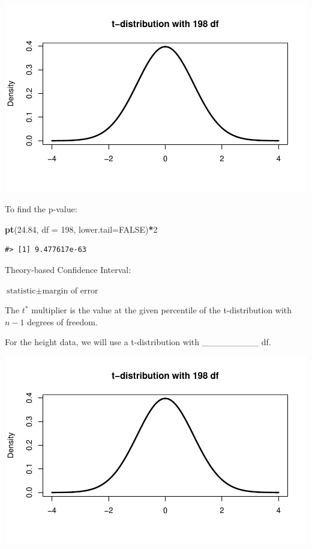 \documentclass[
]{report}
\newenvironment{Shaded}{\begin{snugshade}}{\end{snugshade}}
\newcommand{\AttributeTok}[1]{\textcolor[rgb]{0.13,0.29,0.53}{#1}}
\newcommand{\ConstantTok}[1]{\textcolor[rgb]{0.56,0.35,0.01}{#1}}
\newcommand{\DecValTok}[1]{\textcolor[rgb]{0.00,0.00,0.81}{#1}}
\newcommand{\FloatTok}[1]{\textcolor[rgb]{0.00,0.00,0.81}{#1}}
\newcommand{\FunctionTok}[1]{\textcolor[rgb]{0.13,0.29,0.53}{\textbf{#1}}}
\newcommand{\NormalTok}[1]{#1}
\newcommand{\SpecialCharTok}[1]{\textcolor[rgb]{0.81,0.36,0.00}{\textbf{#1}}}
\newcommand{\rgi}{\hspace{24pt}}  %
\begin{document}
\begin{center}\includegraphics[width=0.7\linewidth]{11-VN11-paired_files/figure-latex/pvalueheight-1} \end{center}

To find the p-value:

\begin{Shaded}
\begin{Highlighting}[]
\FunctionTok{pt}\NormalTok{(}\FloatTok{24.84}\NormalTok{, }\AttributeTok{df =} \DecValTok{198}\NormalTok{, }\AttributeTok{lower.tail=}\ConstantTok{FALSE}\NormalTok{)}\SpecialCharTok{*}\DecValTok{2}
\end{Highlighting}
\end{Shaded}

\begin{verbatim}
#> [1] 9.477617e-63
\end{verbatim}

Theory-based Confidence Interval:

\rgi \(\text{statistic} \pm \text{margin of error}\)

\vspace{0.5in}

The \(t^*\) multiplier is the value at the given percentile of the t-distribution with \(n - 1\) degrees of freedom.

For the height data, we will use a t-distribution with \_\_\_\_\_\_\_\_\_ df.

\begin{center}\includegraphics[width=0.7\linewidth]{11-VN11-paired_files/figure-latex/tstar-1} \end{center}
\end{document}
